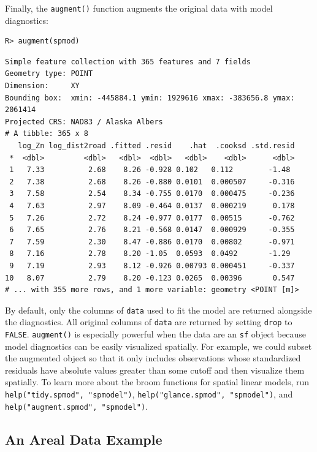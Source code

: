 \documentclass[10pt,letterpaper]{article}
\begin{document}
Finally, the \texttt{augment()} function augments the original data with
model diagnostics:

\begin{verbatim}
R> augment(spmod)
\end{verbatim}

\begin{verbatim}
Simple feature collection with 365 features and 7 fields
Geometry type: POINT
Dimension:     XY
Bounding box:  xmin: -445884.1 ymin: 1929616 xmax: -383656.8 ymax: 2061414
Projected CRS: NAD83 / Alaska Albers
# A tibble: 365 x 8
   log_Zn log_dist2road .fitted .resid    .hat  .cooksd .std.resid
 *  <dbl>         <dbl>   <dbl>  <dbl>   <dbl>    <dbl>      <dbl>
 1   7.33          2.68    8.26 -0.928 0.102   0.112        -1.48 
 2   7.38          2.68    8.26 -0.880 0.0101  0.000507     -0.316
 3   7.58          2.54    8.34 -0.755 0.0170  0.000475     -0.236
 4   7.63          2.97    8.09 -0.464 0.0137  0.000219      0.178
 5   7.26          2.72    8.24 -0.977 0.0177  0.00515      -0.762
 6   7.65          2.76    8.21 -0.568 0.0147  0.000929     -0.355
 7   7.59          2.30    8.47 -0.886 0.0170  0.00802      -0.971
 8   7.16          2.78    8.20 -1.05  0.0593  0.0492       -1.29 
 9   7.19          2.93    8.12 -0.926 0.00793 0.000451     -0.337
10   8.07          2.79    8.20 -0.123 0.0265  0.00396       0.547
# ... with 355 more rows, and 1 more variable: geometry <POINT [m]>
\end{verbatim}

By default, only the columns of \texttt{data} used to fit the model are
returned alongside the diagnostics. All original columns of
\texttt{data} are returned by setting \texttt{drop} to \texttt{FALSE}.
\texttt{augment()} is especially powerful when the data are an
\texttt{sf} object because model diagnostics can be easily visualized
spatially. For example, we could subset the augmented object so that it
only includes observations whose standardized residuals have absolute
values greater than some cutoff and then visualize them spatially. To
learn more about the broom functions for spatial linear models, run
\texttt{help("tidy.spmod",\ "spmodel")},
\texttt{help("glance.spmod",\ "spmodel")}, and
\texttt{help("augment.spmod",\ "spmodel")}.

\hypertarget{an-areal-data-example}{%
\subsection{An Areal Data Example}\label{an-areal-data-example}}
\end{document}
